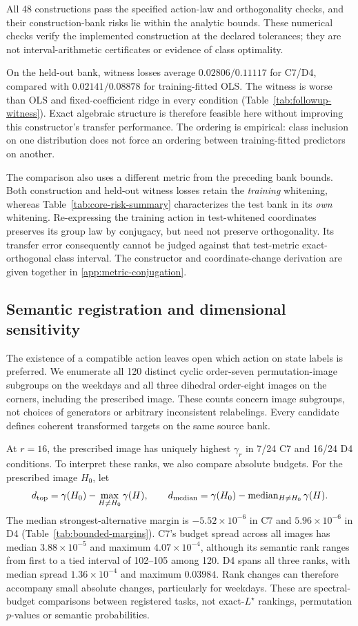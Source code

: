 All 48 constructions pass the specified action-law and orthogonality checks, and their construction-bank risks lie within the analytic bounds. These numerical checks verify the implemented construction at the declared tolerances; they are not interval-arithmetic certificates or evidence of class optimality.

On the held-out bank, witness losses average $0.02806/0.11117$ for C7/D4, compared with $0.02141/0.08878$ for training-fitted OLS. The witness is worse than OLS and fixed-coefficient ridge in every condition (Table~\ref{tab:followup-witness}). Exact algebraic structure is therefore feasible here without improving this constructor's transfer performance. The ordering is empirical: class inclusion on one distribution does not force an ordering between training-fitted predictors on another.

The comparison also uses a different metric from the preceding bank bounds. Both construction and held-out witness losses retain the \emph{training} whitening, whereas Table~\ref{tab:core-risk-summary} characterizes the test bank in its \emph{own} whitening. Re-expressing the training action in test-whitened coordinates preserves its group law by conjugacy, but need not preserve orthogonality. Its transfer error consequently cannot be judged against that test-metric exact-orthogonal class interval. The constructor and coordinate-change derivation are given together in \cref{app:metric-conjugation}.

\subsection{Semantic registration and dimensional sensitivity}
\label{sec:registration-sensitivity}
The existence of a compatible action leaves open which action on state labels is preferred. We enumerate all 120 distinct cyclic order-seven permutation-image subgroups on the weekdays and all three dihedral order-eight images on the corners, including the prescribed image. These counts concern image subgroups, not choices of generators or arbitrary inconsistent relabelings. Every candidate defines coherent transformed targets on the same source bank.

At $r=16$, the prescribed image has uniquely highest $\gamma_r$ in 7/24 C7 and 16/24 D4 conditions. To interpret these ranks, we also compare absolute budgets. For the prescribed image $H_0$, let
\[
 d_{\rm top}=\gamma(H_0)-\max_{H\ne H_0}\gamma(H),\qquad
 d_{\rm median}=\gamma(H_0)-\operatorname{median}_{H\ne H_0}\gamma(H).
\]
The median strongest-alternative margin is $-5.52\times10^{-6}$ in C7 and $5.96\times10^{-6}$ in D4 (Table~\ref{tab:bounded-margins}). C7's budget spread across all images has median $3.88\times10^{-5}$ and maximum $4.07\times10^{-4}$, although its semantic rank ranges from first to a tied interval of 102--105 among 120. D4 spans all three ranks, with median spread $1.36\times10^{-4}$ and maximum $0.03984$. Rank changes can therefore accompany small absolute changes, particularly for weekdays. These are spectral-budget comparisons between registered tasks, not exact-$L^\star$ rankings, permutation $p$-values or semantic probabilities.

